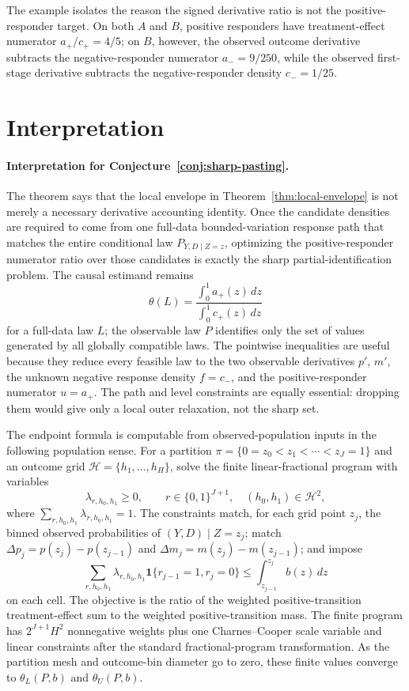 \documentclass[11pt]{article}
\newcommand{\one}{\mathbf{1}}
\theoremstyle{definition}
\theoremstyle{plain}
\theoremstyle{remark}
\begin{document}
The example isolates the reason the signed derivative ratio is not the
positive-responder target.  On both \(A\) and \(B\), positive responders have
treatment-effect numerator \(a_+/c_+=4/5\); on \(B\), however, the observed
outcome derivative subtracts the negative-responder numerator
\(a_-=9/250\), while the observed first-stage derivative subtracts the
negative-responder density \(c_-=1/25\).

\section{Interpretation}
\paragraph{Interpretation for Conjecture~\ref{conj:sharp-pasting}.}
The theorem says that the local envelope in Theorem~\ref{thm:local-envelope}
is not merely a necessary derivative accounting identity.  Once the candidate
densities are required to come from one full-data bounded-variation response
path that matches the entire conditional law \(P_{Y,D\mid Z=z}\), optimizing
the positive-responder numerator ratio over those candidates is exactly the
sharp partial-identification problem.  The causal estimand remains
\[
\theta(L)=
\frac{\int_0^1 a_+(z)\,dz}{\int_0^1 c_+(z)\,dz}
\]
for a full-data law \(L\); the observable law \(P\) identifies only the set of
values generated by all globally compatible laws.  The pointwise inequalities
are useful because they reduce every feasible law to the two observable
derivatives \(p'\), \(m'\), the unknown negative response density \(f=c_-\),
and the positive-responder numerator \(u=a_+\).  The path and level
constraints are equally essential: dropping them would give only a local outer
relaxation, not the sharp set.

The endpoint formula is computable from observed-population inputs in the
following population sense.  For a partition
\(\pi=\{0=z_0<z_1<\cdots<z_J=1\}\) and an outcome grid
\(\mathcal H=\{h_1,\ldots,h_H\}\), solve the finite linear-fractional program
with variables
\[
\lambda_{r,h_0,h_1}\ge0,
\qquad
r\in\{0,1\}^{J+1},\quad (h_0,h_1)\in\mathcal H^2,
\]
where \(\sum_{r,h_0,h_1}\lambda_{r,h_0,h_1}=1\).  The constraints match, for
each grid point \(z_j\), the binned observed probabilities of
\((Y,D)\mid Z=z_j\); match \(\Delta p_j=p(z_j)-p(z_{j-1})\) and
\(\Delta m_j=m(z_j)-m(z_{j-1})\); and impose
\[
\sum_{r,h_0,h_1}\lambda_{r,h_0,h_1}
\one\{r_{j-1}=1,r_j=0\}
\le \int_{z_{j-1}}^{z_j}b(z)\,dz
\]
on each cell.  The objective is the ratio of the weighted positive-transition
treatment-effect sum to the weighted positive-transition mass.  The finite
program has \(2^{J+1}H^2\) nonnegative weights plus one Charnes--Cooper scale
variable and linear constraints after the standard fractional-program
transformation.  As the partition mesh and outcome-bin diameter go to zero,
these finite values converge to \(\theta_L(P,b)\) and \(\theta_U(P,b)\).
\end{document}
